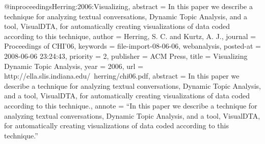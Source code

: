 @inproceedings{Herring:2006:Visualizing,
	abstract = {In this paper we describe a technique for analyzing textual conversations, Dynamic Topic Analysis, and a tool, VisualDTA, for automatically creating visualizations of data coded according to this technique},
	author = {Herring, S. C. and Kurtz, A. J.},
	journal = {Proceedings of CHI'06},
	keywords = {file-import-08-06-06, webanalysis},
	posted-at = {2008-06-06 23:24:43},
	priority = {2},
	publisher = {ACM Press},
	title = {Visualizing Dynamic Topic Analysis},
	year = {2006},
	url = {http://ella.slis.indiana.edu/~herring/chi06.pdf},
	abstract = {In this paper we describe a technique for analyzing textual conversations, Dynamic Topic Analysis, and a tool, VisualDTA, for automatically creating visualizations of data coded according to this technique.},
	annote = {``In this paper we describe a technique for analyzing textual conversations, Dynamic Topic Analysis, and a tool, VisualDTA, for automatically creating visualizations of data coded according to this technique.''}
}


